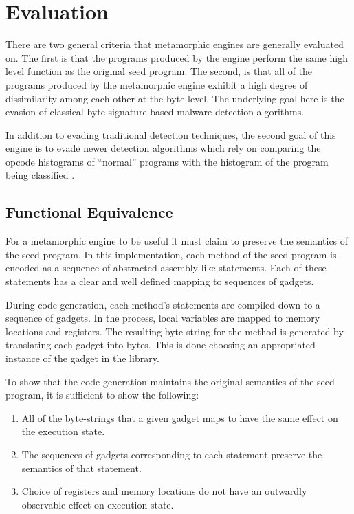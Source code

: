 \chapter{Evaluation}

    There are two general criteria that metamorphic engines are generally
    evaluated on. The first is that the programs produced by the engine
    perform the same high level function as the original seed program. The
    second, is that all of the programs produced by the metamorphic engine
    exhibit a high degree of dissimilarity among each other at the byte
    level. The underlying goal here is the evasion of classical
    byte signature based malware detection algorithms.

    In addition to evading traditional detection techniques, the second goal
    of this engine is to evade newer detection algorithms which rely on
    comparing the opcode histograms of ``normal'' programs with the
    histogram of the program being classified \cite{histogram}.

\section{Functional Equivalence}

    For a metamorphic engine to be useful it must claim to preserve the
    semantics of the seed program. In this implementation, each method of
    the seed program is encoded as a sequence of abstracted assembly-like
    statements. Each of these statements has a clear and well defined
    mapping to sequences of gadgets.
    
    During code generation, each method's statements are compiled down to a
    sequence of gadgets. In the process, local variables are mapped to
    memory locations and registers. The resulting byte-string for the method
    is generated by translating each gadget into bytes. This is done
    choosing an appropriated instance of the gadget in the library.

    To show that the code generation maintains the original semantics of the
    seed program, it is sufficient to show the following:

    \begin{enumerate}

        \item All of the byte-strings that a given gadget maps to have the
            same effect on the execution state.

        \item The sequences of gadgets corresponding to each statement
            preserve the semantics of that statement.

        \item Choice of registers and memory locations do not have an
            outwardly observable effect on execution state.

    \end{enumerate}

